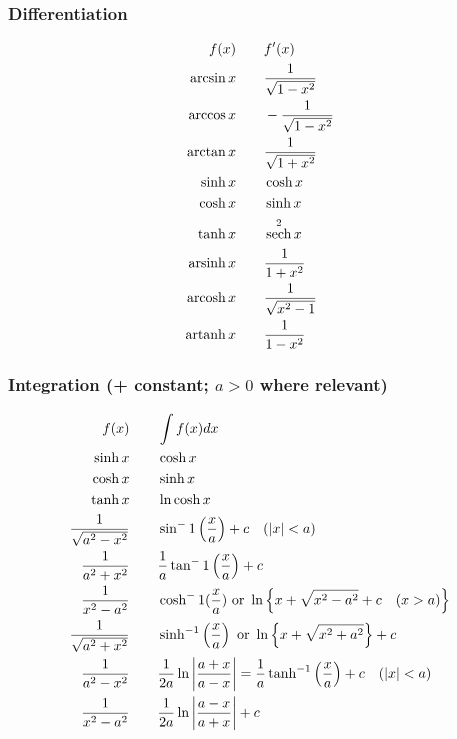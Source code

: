 \documentclass{book}
\DeclareMathOperator{\sech}{sech}
\DeclareMathOperator{\arsinh}{arsinh}
\DeclareMathOperator{\arcosh}{arcosh}
\DeclareMathOperator{\artanh}{artanh}
\begin{document}
            \subsubsection{Differentiation}
            \begin{alignat}{2}
                f(x)&\qquad f'(x) \notag\\
                \arcsin x&\qquad\frac{1}{\sqrt{1-x^2}} \\
                \arccos x&\qquad-\frac{1}{\sqrt{1-x^2}} \\
                \arctan x&\qquad\frac{1}{\sqrt{1+x^2}} \\
                \sinh x&\qquad\cosh x \\
                \cosh x&\qquad\sinh x \\
                \tanh x&\qquad\sech^2x \\
                \arsinh x&\qquad\frac{1}{1+x^2} \\
                \arcosh x&\qquad\frac{1}{\sqrt{x^2-1}} \\
                \artanh x&\qquad \frac{1}{1-x^2}\\
            \end{alignat}

            \subsubsection{Integration (+ constant; $a>0$ where relevant)}
            \begin{alignat}{2}
                f(x)&\qquad \int f(x)dx \notag\\
                \sinh x&\qquad\cosh x \\
                \cosh x&\qquad\sinh x \\
                \tanh x&\qquad\ln\cosh x \\
                \frac{1}{\sqrt{a^2-x^2}}&\qquad\sin^-1\left(\frac{x}{a}\right)+c\quad(|x|<a) \\
                \frac{1}{a^2+x^2}&\qquad\frac{1}{a}\tan^-1\left(\frac{x}{a}\right)+c \\
                \frac{1}{x^2-a^2}&\qquad\cosh^-1(\frac{x}{a})\ \text{or}\ \ln\left\{x+\sqrt{x^2-a^2}+c\quad(x>a)\right\} \\
                \frac{1}{\sqrt{a^2+x^2}}&\qquad\sinh^{-1}\left(\frac{x}{a}\right)\ \text{or}\ \ln\left\{x+\sqrt{x^2+a^2}\right\}+c \\
                \frac{1}{a^2-x^2}&\qquad\frac{1}{2a}\ln\left|\frac{a+x}{a-x}\right|=\frac{1}{a}\tanh^{-1}\left(\frac{x}{a}\right)+c\quad(|x|<a) \\
                \frac{1}{x^2-a^2}&\qquad\frac{1}{2a}\ln\left|\frac{a-x}{a+x}\right|+c
            \end{alignat}
\end{document}
